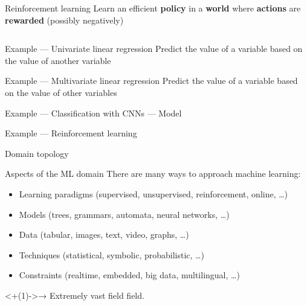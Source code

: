 \begin{frame}{Reinforcement learning}
  Learn an efficient \textbf{policy} in a \textbf{world} where \textbf{actions} are \textbf{rewarded} (possibly negatively)
  \vfill
  \begin{columns}[T]
    \begin{column}{0.5\textwidth}
    \end{column}
    \begin{column}{0.5\textwidth}
    \end{column}
  \end{columns}
\end{frame}

\begin{frame}{Example --- Univariate linear regression}
  Predict the value of a variable based on the value of another variable

\end{frame}

\begin{frame}{Example --- Multivariate linear regression}
  Predict the value of a variable based on the value of other variables

\end{frame}

\begin{frame}{Example --- Classification with CNNs --- Model}
\end{frame}

\begin{frame}{Example --- Reinforcement learning}
\end{frame}

\begin{frame}{Domain topology}
\end{frame}

\begin{frame}{Aspects of the ML domain}
  There are many ways to approach machine learning:
  \begin{itemize}[<+(1)->]
  \item Learning paradigms (supervised, unsupervised, reinforcement, online, …)
  \item Models (trees, grammars, automata, neural networks, …)
  \item Data (tabular, images, text, video, graphs, …)
  \item Techniques (statistical, symbolic, probabilistic, …)
  \item Constraints (realtime, embedded, big data, multilingual, …)
  \end{itemize}

  \onslide<+(1)->{→ Extremely vast field field.}
\end{frame}

